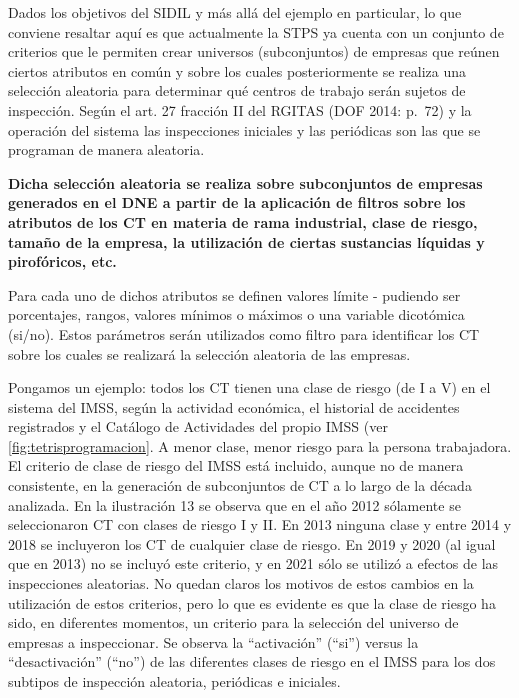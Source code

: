 \documentclass[
]{article}
\begin{document}
Dados los objetivos del SIDIL y más allá del ejemplo en particular, lo que conviene resaltar aquí es que actualmente la STPS ya cuenta con un conjunto de criterios que le permiten crear universos (subconjuntos) de empresas que reúnen ciertos atributos en común y sobre los cuales posteriormente se realiza una selección aleatoria para determinar qué centros de trabajo serán sujetos de inspección. Según el art. 27 fracción II del RGITAS (DOF 2014: p.~72) y la operación del sistema las inspecciones iniciales y las periódicas son las que se programan de manera aleatoria.

\textbf{Dicha selección aleatoria se realiza sobre subconjuntos de empresas generados en el DNE a partir de la aplicación de filtros sobre los atributos de los CT en materia de rama industrial, clase de riesgo, tamaño de la empresa, la utilización de ciertas sustancias líquidas y pirofóricos, etc.}

Para cada uno de dichos atributos se definen valores límite - pudiendo ser porcentajes, rangos, valores mínimos o máximos o una variable dicotómica (si/no). Estos parámetros serán utilizados como filtro para identificar los CT sobre los cuales se realizará la selección aleatoria de las empresas.

Pongamos un ejemplo: todos los CT tienen una clase de riesgo (de I a V) en el sistema del IMSS, según la actividad económica, el historial de accidentes registrados y el Catálogo de Actividades del propio IMSS (ver \ref{fig:tetrisprogramacion}. A menor clase, menor riesgo para la persona trabajadora. El criterio de clase de riesgo del IMSS está incluido, aunque no de manera consistente, en la generación de subconjuntos de CT a lo largo de la década analizada. En la ilustración 13 se observa que en el año 2012 sólamente se seleccionaron CT con clases de riesgo I y II. En 2013 ninguna clase y entre 2014 y 2018 se incluyeron los CT de cualquier clase de riesgo. En 2019 y 2020 (al igual que en 2013) no se incluyó este criterio, y en 2021 sólo se utilizó a efectos de las inspecciones aleatorias. No quedan claros los motivos de estos cambios en la utilización de estos criterios, pero lo que es evidente es que la clase de riesgo ha sido, en diferentes momentos, un criterio para la selección del universo de empresas a inspeccionar. Se observa la ``activación'' (``si'') versus la ``desactivación'' (``no'') de las diferentes clases de riesgo en el IMSS para los dos subtipos de inspección aleatoria, periódicas e iniciales.
\end{document}
